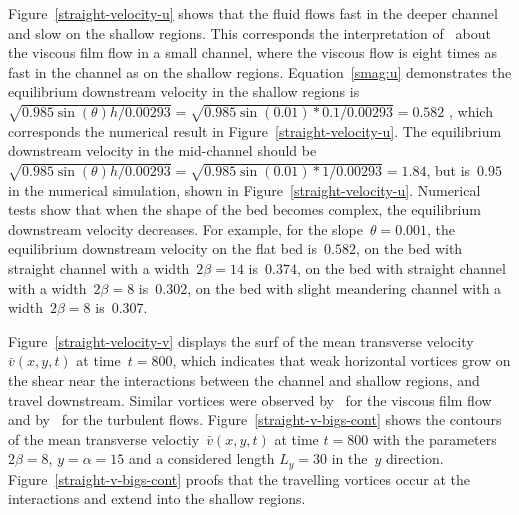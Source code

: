 \documentclass[12pt,a5paper]{article}
\newcommand{\vv}{{\bar v}}
\begin{document}
Figure~\ref{straight-velocity-u} shows that the fluid flows fast in the deeper channel and slow on the shallow regions. 
This corresponds the interpretation of~\cite{Robertsli2006} about the viscous film flow in a small channel, where the viscous flow is eight times as fast in the channel as on the shallow regions. 
Equation~\eqref{smag:u} demonstrates the equilibrium downstream velocity in the shallow regions is $\sqrt{0.985\sin(\theta)h/0.00293}=\sqrt{0.985\sin(0.01)*0.1/0.00293}=0.582$ , which corresponds the numerical result in Figure~\ref{straight-velocity-u}. 
The equilibrium downstream velocity in the mid-channel should be $\sqrt{0.985\sin(\theta)h/0.00293}=\sqrt{0.985\sin(0.01)*1/0.00293}=1.84$, but is~$0.95$ in the numerical simulation, shown in Figure~\ref{straight-velocity-u}. 
Numerical tests show that when the shape of the bed becomes complex, the equilibrium downstream velocity decreases. 
For example, for the slope~$\theta=0.001$, the equilibrium downstream velocity on the flat bed is~$0.582$, on the bed with straight channel with a width~$2\beta=14$ is~$0.374$, on the bed with straight channel with a width~$2\beta=8$ is~$0.302$, on the bed with slight meandering channel with a width~$2\beta=8$ is~$0.307$.

Figure~\ref{straight-velocity-v} displays the surf of the mean transverse velocity~$\vv(x,y,t)$ at time~$t=800$, which indicates that weak horizontal vortices grow on the shear near the interactions between the channel and shallow regions, and travel downstream. 
Similar vortices were observed by~\cite{Robertsli2006} for the viscous film flow and by~\cite{Bousmar2003a} for the turbulent flows. 
Figure~\ref{straight-v-bigs-cont} shows the contours of the mean transverse veloctiy~$\vv(x,y,t)$ at time $t=800$ with the parameters $2\beta=8$, $y=\alpha=15$ and a considered length $L_y=30$ in the~$y$ direction. 
Figure~\ref{straight-v-bigs-cont} proofs that the travelling vortices occur at the interactions and extend into the shallow regions. 
\end{document}
